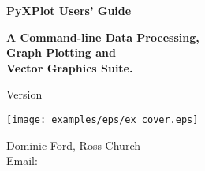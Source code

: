\documentclass[a4paper,onecolumn,11pt]{book}
\begin{document}
\begin{titlepage}
\normalsize
\vspace*{0.5cm}
\begin{center}
{\Huge \bf PyXPlot Users' Guide}\\
\end{center}
\vspace*{0.5cm}
\begin{center}
{\LARGE \bf A Command-line Data Processing, \\ \vspace{2mm} Graph Plotting and \\ \vspace{2mm} Vector Graphics Suite. \\}
\end{center}
\vspace*{0.5cm}
\begin{center}
{\Large Version \version \\}
\end{center}
\vspace*{0.0cm}
\begin{center}
\texttt{[image: examples/eps/ex\_cover.eps]}
\end{center}
\vspace*{0.0cm}
\begin{center}
{\Large Dominic Ford, Ross Church \\ \vspace{2mm} Email:  \\ }
\end{center}
\vspace*{0.5cm}
\begin{center}
{\Large \reldate \\}
\end{center}
\end{titlepage}


\tableofcontents

\listoffigures
{}








\appendix












\printindex
\end{document}
